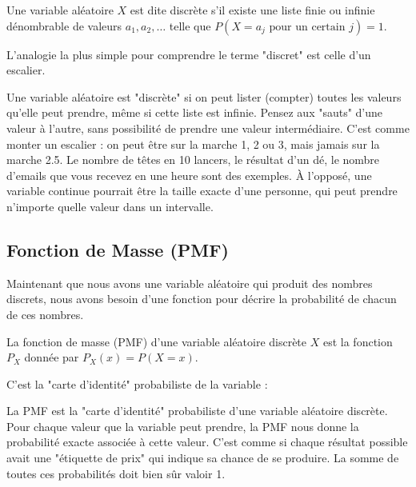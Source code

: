\begin{definitionbox}
Une variable aléatoire $X$ est dite discrète s'il existe une liste finie ou infinie dénombrable de valeurs $a_1, a_2, \dots$ telle que $P(X=a_j \text{ pour un certain } j) = 1$.
\end{definitionbox}

L'analogie la plus simple pour comprendre le terme "discret" est celle d'un escalier.

\begin{intuitionbox}
Une variable aléatoire est "discrète" si on peut lister (compter) toutes les valeurs qu'elle peut prendre, même si cette liste est infinie. Pensez aux "sauts" d'une valeur à l'autre, sans possibilité de prendre une valeur intermédiaire. C'est comme monter un escalier : on peut être sur la marche 1, 2 ou 3, mais jamais sur la marche 2.5. Le nombre de têtes en 10 lancers, le résultat d'un dé, le nombre d'emails que vous recevez en une heure sont des exemples. À l'opposé, une variable continue pourrait être la taille exacte d'une personne, qui peut prendre n'importe quelle valeur dans un intervalle.
\end{intuitionbox}

\subsection{Fonction de Masse (PMF)}

Maintenant que nous avons une variable aléatoire qui produit des nombres discrets, nous avons besoin d'une fonction pour décrire la probabilité de chacun de ces nombres.

\begin{definitionbox}
La fonction de masse (PMF) d'une variable aléatoire discrète $X$ est la fonction $P_X$ donnée par $P_X(x) = P(X=x)$.
\end{definitionbox}

C'est la "carte d'identité" probabiliste de la variable :

\begin{intuitionbox}
La PMF est la "carte d'identité" probabiliste d'une variable aléatoire discrète. Pour chaque valeur que la variable peut prendre, la PMF nous donne la probabilité exacte associée à cette valeur. C'est comme si chaque résultat possible avait une "étiquette de prix" qui indique sa chance de se produire. La somme de toutes ces probabilités doit bien sûr valoir 1.
\end{intuitionbox}

